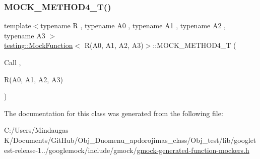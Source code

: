 \mbox{\label{classtesting_1_1_mock_function_3_01_r_07_a0_00_01_a1_00_01_a2_00_01_a3_08_4_ad158c25a1b33cb53bae3f0eb9df0d59c}} 
\subsubsection{\texorpdfstring{MOCK\_METHOD4\_T()}{MOCK\_METHOD4\_T()}}
{\footnotesize\ttfamily template$<$typename R , typename A0 , typename A1 , typename A2 , typename A3 $>$ \\
\mbox{\hyperlink{classtesting_1_1_mock_function}{testing\+::\+Mock\+Function}}$<$ R(A0, A1, A2, A3)$>$\+::M\+O\+C\+K\+\_\+\+M\+E\+T\+H\+O\+D4\+\_\+T (\begin{DoxyParamCaption}\item[{Call}]{,  }\item[{R(A0, A1, A2, A3)}]{ }\end{DoxyParamCaption})}



The documentation for this class was generated from the following file\+:\begin{DoxyCompactItemize}
\item 
C\+:/\+Users/\+Mindaugas K/\+Documents/\+Git\+Hub/\+Obj\+\_\+\+Duomenu\+\_\+apdorojimas\+\_\+class/\+Obj\+\_\+test/lib/googletest-\/release-\/1../googlemock/include/gmock/\mbox{\hyperlink{_obj__test_2lib_2googletest-release-1_88_81_2googlemock_2include_2gmock_2gmock-generated-function-mockers_8h}{gmock-\/generated-\/function-\/mockers.\+h}}\end{DoxyCompactItemize}
